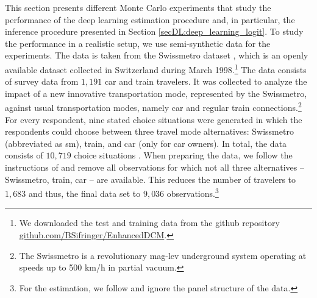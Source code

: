 \documentclass[a4paper, 12pt]{article}
\begin{document}
This section presents different Monte Carlo experiments that study the performance of the deep learning estimation procedure and, in particular, the inference procedure presented in Section \ref{secDL:deep_learning_logit}. 
To study the performance in a realistic setup, we use semi-synthetic data for the experiments. The data is taken from the Swissmetro dataset \cite{bierlaire2001}, which is an openly available dataset collected in Switzerland during March 1998.\footnote{We downloaded the test and training data from the github repository \hyperlink{https://github.com/BSifringer/EnhancedDCM/tree/master/ready_example/swissmetro_paper}{github.com/BSifringer/EnhancedDCM}.} The data consists of survey data from $1,191$ car and train travelers. It was collected to analyze the impact of a new innovative transportation mode, represented by the Swissmetro, against usual transportation modes, namely car and regular train connections.\footnote{The Swissmetro is a revolutionary mag-lev underground system operating at speeds up to 500 km/h in partial vacuum.} For every respondent, nine stated choice situations were generated in which the respondents could choose between three travel mode alternatives: Swissmetro (abbreviated as sm), train, and car (only for car owners). In total, the data consists of $10,719$ choice situations \cite{antonini2007swissmetro}. When preparing the data, we follow the instructions of  and remove all observations for which not all three alternatives -- Swissmetro, train, car -- are available. This reduces the number of travelers to $1,683$ and thus, the final data set to $9,036$ observations.\footnote{For the estimation, we follow  and ignore the panel structure of the data.} 
\end{document}
